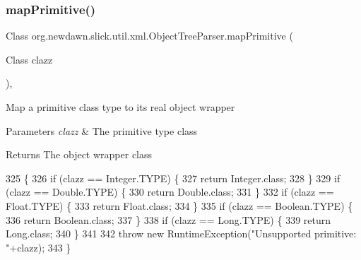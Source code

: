 \subsubsection{\texorpdfstring{map\+Primitive()}{mapPrimitive()}}
{\footnotesize\ttfamily Class org.\+newdawn.\+slick.\+util.\+xml.\+Object\+Tree\+Parser.\+map\+Primitive (\begin{DoxyParamCaption}\item[{Class}]{clazz }\end{DoxyParamCaption})\hspace{0.3cm}{\ttfamily [inline]}, {\ttfamily [private]}}

Map a primitive class type to it\textquotesingle{}s real object wrapper


\begin{DoxyParams}{Parameters}
{\em clazz} & The primitive type class \\
\hline
\end{DoxyParams}
\begin{DoxyReturn}{Returns}
The object wrapper class 
\end{DoxyReturn}

\begin{DoxyCode}
325                                             \{
326         \textcolor{keywordflow}{if} (clazz == Integer.TYPE) \{
327             \textcolor{keywordflow}{return} Integer.class;
328         \}
329         \textcolor{keywordflow}{if} (clazz == Double.TYPE) \{
330             \textcolor{keywordflow}{return} Double.class;
331         \}
332         \textcolor{keywordflow}{if} (clazz == Float.TYPE) \{
333             \textcolor{keywordflow}{return} Float.class;
334         \}
335         \textcolor{keywordflow}{if} (clazz == Boolean.TYPE) \{
336             \textcolor{keywordflow}{return} Boolean.class;
337         \}
338         \textcolor{keywordflow}{if} (clazz == Long.TYPE) \{
339             \textcolor{keywordflow}{return} Long.class;
340         \}
341         
342         \textcolor{keywordflow}{throw} \textcolor{keyword}{new} RuntimeException(\textcolor{stringliteral}{"Unsupported primitive: "}+clazz);
343     \}
\end{DoxyCode}
\mbox{\label{classorg_1_1newdawn_1_1slick_1_1util_1_1xml_1_1_object_tree_parser_a0e937d050a1ad0e58e24465f87ac5eee}} 
